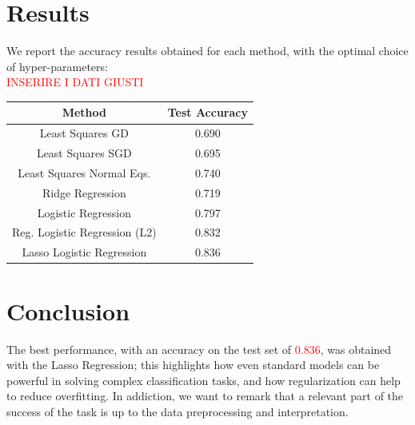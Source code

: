 \documentclass[10pt,conference,compsocconf]{IEEEtran}
\begin{document}
\section{Results}
\label{results}
We report the accuracy results obtained for each method, with the optimal choice of hyper-parameters: \\

\textcolor{red}{INSERIRE I DATI GIUSTI}
\begin{center}
\label{table1}
\begin{tabular}{|c c|} 
 \hline
 Method & Test Accuracy  \\ [0.5ex] 
 \hline\hline
 Least Squares GD & 0.690   \\ 
 \hline
 Least Squares SGD & 0.695  \\
 \hline
 Least Squares Normal Eqs. & 0.740   \\
 \hline
 Ridge Regression & 0.719   \\ 
 \hline
 Logistic Regression & 0.797   \\
 \hline
 Reg. Logistic Regression (L2) & 0.832   \\
 \hline
 Lasso Logistic Regression & 0.836   \\
 \hline
\end{tabular}
\end{center}



\section{Conclusion}

The best performance, with an accuracy on the test set of \textcolor{red}{0.836}, was obtained with the Lasso Regression; this highlights how even standard models can be powerful in solving complex classification tasks, and how regularization can help to reduce overfitting.
In addiction, we want to remark that a relevant part of the success of the task is up to the data preprocessing and interpretation.
\end{document}
